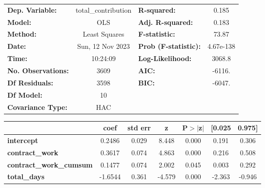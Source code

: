 \begin{center}
\begin{tabular}{lclc}
\toprule
\textbf{Dep. Variable:}                  & total\_contribution & \textbf{  R-squared:         } &     0.185   \\
\textbf{Model:}                          &         OLS         & \textbf{  Adj. R-squared:    } &     0.183   \\
\textbf{Method:}                         &    Least Squares    & \textbf{  F-statistic:       } &     73.87   \\
\textbf{Date:}                           &   Sun, 12 Nov 2023  & \textbf{  Prob (F-statistic):} & 4.67e-138   \\
\textbf{Time:}                           &       10:24:09      & \textbf{  Log-Likelihood:    } &    3068.8   \\
\textbf{No. Observations:}               &          3609       & \textbf{  AIC:               } &    -6116.   \\
\textbf{Df Residuals:}                   &          3598       & \textbf{  BIC:               } &    -6047.   \\
\textbf{Df Model:}                       &            10       & \textbf{                     } &             \\
\textbf{Covariance Type:}                &         HAC         & \textbf{                     } &             \\
\bottomrule
\end{tabular}
\begin{tabular}{lcccccc}
                                         & \textbf{coef} & \textbf{std err} & \textbf{z} & \textbf{P$> |$z$|$} & \textbf{[0.025} & \textbf{0.975]}  \\
\midrule
\textbf{intercept}                       &       0.2486  &        0.029     &     8.448  &         0.000        &        0.191    &        0.306     \\
\textbf{contract\_work}                  &       0.3617  &        0.074     &     4.863  &         0.000        &        0.216    &        0.508     \\
\textbf{contract\_work\_cumsum}          &       0.1477  &        0.074     &     2.002  &         0.045        &        0.003    &        0.292     \\
\textbf{total\_days}                     &      -1.6544  &        0.361     &    -4.579  &         0.000        &       -2.363    &       -0.946     \\

\end{tabular}
\end{center}
